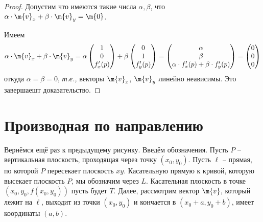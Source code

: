 \begin{proof}
Допустим что имеются такие числа $\alpha, \beta$, что $\alpha \cdot\m{v}_x+ \beta \cdot \m{v}_y = \m{0}$.

Имеем
\[
 \alpha \cdot\m{v}_x+ \beta \cdot \m{v}_y =  \alpha \begin{pmatrix}
     1 \\ 0 \\ f'_x(p)
 \end{pmatrix} + \beta \begin{pmatrix}
     0 \\ 1 \\ f'_y(p) \end{pmatrix} = \begin{pmatrix}
        \alpha \\ \beta \\ \alpha \cdot f_x'(p) + \beta \cdot f'_y(p)
     \end{pmatrix} = \begin{pmatrix}
         0\\0\\0
     \end{pmatrix}
\]
откуда $\alpha = \beta = 0$, \textit{т.е.,} векторы $\m{v}_x$, $\m{v}_y$ линейно неависимы. Это завершаешт доказательство.
\end{proof}


\section{Производная по направлению}
Вернёмся ещё раз к предыдущему рисунку. Введём обозначения. Пусть $P$ -- вертикальная плоскость, проходящая через точку $(x_0,y_0)$. Пусть $\ell$ -- прямая, по которой $P$ пересекает плоскость $xy$. Касательную прямую к кривой, которую высекает плоскость $P$, мы обозначим через $L$. Касательная плоскость в точке $(x_0,y_0, f(x_0,y_0))$ пусть будет $T$. Далее, рассмотрим вектор $\m{v}$, который лежит на $\ell$, выходит из точки $(x_0,y_0)$ и кончается в $(x_0+a, y_0 +b)$, \ie имеет координаты $(a,b)$.

